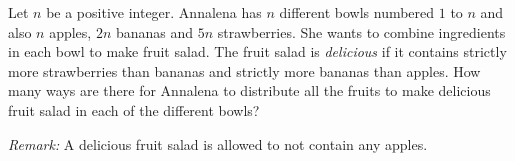Let $n$ be a positive integer.
Annalena has $n$ different bowls numbered $1$ to $n$ and also $n$ apples, $2n$ bananas and $5n$ strawberries.
She wants to combine ingredients in each bowl to make fruit salad.
The fruit salad is \emph{delicious} if it contains strictly more strawberries than bananas and
strictly more bananas than apples.
How many ways are there for Annalena to distribute all the fruits to make delicious fruit salad
in each of the different bowls?

\emph{Remark:} A delicious fruit salad is allowed to not contain any apples.
